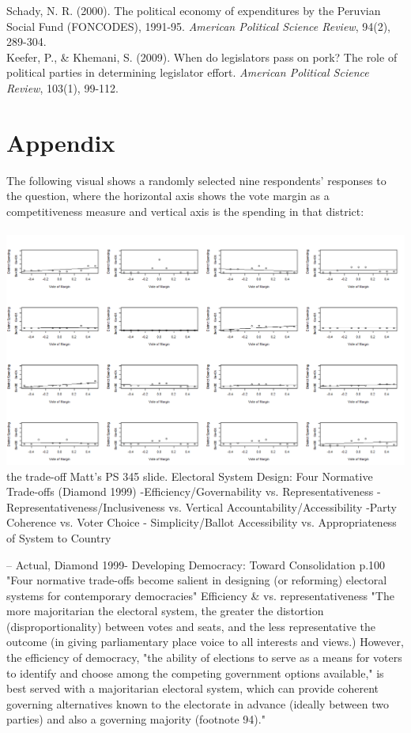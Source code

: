 \documentclass{article}
\begin{document}
Schady, N. R. (2000). The political economy of expenditures by the Peruvian Social Fund (FONCODES), 1991-95. \textit{American Political Science Review}, 94(2), 289-304.\\

Keefer, P., \& Khemani, S. (2009). When do legislators pass on pork? The role of political parties in determining legislator effort. \textit{American Political Science Review}, 103(1), 99-112.\\

\section{Appendix} 
The following visual shows a randomly selected nine respondents' responses to the question, where the horizontal axis shows the vote margin as a competitiveness measure and vertical axis is the spending in that district:\\
\\
\includegraphics[width=180mm]{Respondents_1}
\\

\iffalse the trade-off
Matt's PS 345 slide. 
Electoral System Design: Four Normative Trade-offs (Diamond 1999)
-Efficiency/Governability vs. Representativeness
-Representativeness/Inclusiveness vs. Vertical Accountability/Accessibility 
-Party Coherence vs. Voter Choice
- Simplicity/Ballot Accessibility vs. Appropriateness of System to Country

--
Actual, Diamond 1999- Developing Democracy: Toward Consolidation p.100
"Four normative trade-offs become salient in designing (or reforming) electoral systems for contemporary democracies"
Efficiency \&  vs. representativeness
"The more majoritarian the electoral system, the greater the distortion (disproportionality) between votes and seats, and the less representative the outcome (in giving parliamentary place voice to all interests and views.) However, the efficiency of democracy, "the ability of elections to serve as a means for voters to identify and choose among the competing government options available," is best served with a majoritarian electoral system, which can provide coherent governing alternatives known to the electorate in advance (ideally between two parties) and also a governing majority (footnote 94)."
\end{document}
